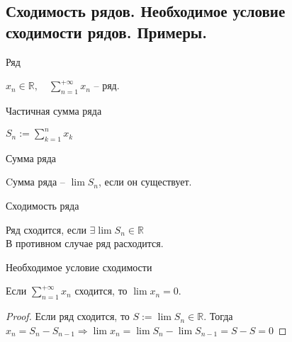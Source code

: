 \subsection{Сходимость рядов. Необходимое условие сходимости рядов. Примеры.}
    
\begin{conj}Ряд\end{conj}
$x_n \in \mathbb{R}, \quad \sum_{n=1}^{+\infty} x_n$ -- ряд.

\begin{conj}Частичная сумма ряда\end{conj}
$S_n := \sum_{k=1}^{n} x_k$

\begin{conj}Сумма ряда\end{conj}
Cумма ряда -- $\lim S_n$, если он существует.

\begin{conj}Сходимость ряда\end{conj}
Ряд сходится, если $\exists \lim S_n \in \mathbb{R}$\\
В противном случае ряд расходится.

\begin{theorem-non}
Необходимое условие сходимости
\end{theorem-non}
Если $\sum_{n = 1}^{+\infty} x_n$ сходится, то $\lim x_n = 0$.

\begin{proof}
    Если ряд сходится, то $S := \lim S_n \in \mathbb{R}$. Тогда
    $x_n = S_n - S_{n - 1} \Rightarrow \lim x_n = \lim S_n - 
    \lim S_{n - 1} = S - S = 0$
\end{proof}

